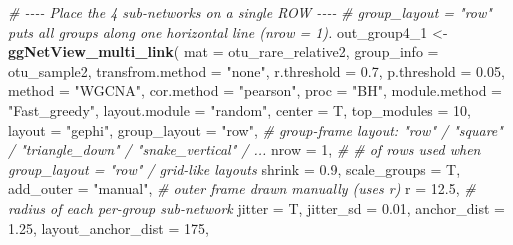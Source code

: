 \documentclass[
]{book}
\newenvironment{Shaded}{\begin{snugshade}}{\end{snugshade}}
\newcommand{\AttributeTok}[1]{\textcolor[rgb]{0.13,0.29,0.53}{#1}}
\newcommand{\CommentTok}[1]{\textcolor[rgb]{0.56,0.35,0.01}{\textit{#1}}}
\newcommand{\DecValTok}[1]{\textcolor[rgb]{0.00,0.00,0.81}{#1}}
\newcommand{\FloatTok}[1]{\textcolor[rgb]{0.00,0.00,0.81}{#1}}
\newcommand{\FunctionTok}[1]{\textcolor[rgb]{0.13,0.29,0.53}{\textbf{#1}}}
\newcommand{\NormalTok}[1]{#1}
\newcommand{\OtherTok}[1]{\textcolor[rgb]{0.56,0.35,0.01}{#1}}
\newcommand{\StringTok}[1]{\textcolor[rgb]{0.31,0.60,0.02}{#1}}
\begin{document}
\begin{Shaded}
\begin{Highlighting}[]
\CommentTok{\# {-}{-}{-}{-} Place the 4 sub{-}networks on a single ROW {-}{-}{-}{-}}
\CommentTok{\# \textasciigrave{}group\_layout = "row"\textasciigrave{} puts all groups along one horizontal line (nrow = 1).}
\NormalTok{out\_group4\_1 }\OtherTok{\textless{}{-}} \FunctionTok{ggNetView\_multi\_link}\NormalTok{(}
  \AttributeTok{mat                          =}\NormalTok{ otu\_rare\_relative2,}
  \AttributeTok{group\_info                   =}\NormalTok{ otu\_sample2,}
  \AttributeTok{transfrom.method             =} \StringTok{"none"}\NormalTok{,}
  \AttributeTok{r.threshold                  =} \FloatTok{0.7}\NormalTok{,}
  \AttributeTok{p.threshold                  =} \FloatTok{0.05}\NormalTok{,}
  \AttributeTok{method                       =} \StringTok{"WGCNA"}\NormalTok{,}
  \AttributeTok{cor.method                   =} \StringTok{"pearson"}\NormalTok{,}
  \AttributeTok{proc                         =} \StringTok{"BH"}\NormalTok{,}
  \AttributeTok{module.method                =} \StringTok{"Fast\_greedy"}\NormalTok{,}
  \AttributeTok{layout.module                =} \StringTok{"random"}\NormalTok{,}
  \AttributeTok{center                       =}\NormalTok{ T,}
  \AttributeTok{top\_modules                  =} \DecValTok{10}\NormalTok{,}
  \AttributeTok{layout                       =} \StringTok{"gephi"}\NormalTok{,}
  \AttributeTok{group\_layout                 =} \StringTok{"row"}\NormalTok{,         }\CommentTok{\# group{-}frame layout: "row" / "square" / "triangle\_down" / "snake\_vertical" / ...}
  \AttributeTok{nrow                         =} \DecValTok{1}\NormalTok{,             }\CommentTok{\# \# of rows used when \textasciigrave{}group\_layout = "row"\textasciigrave{} / grid{-}like layouts}
  \AttributeTok{shrink                       =} \FloatTok{0.9}\NormalTok{,}
  \AttributeTok{scale\_groups                 =}\NormalTok{ T,}
  \AttributeTok{add\_outer                    =} \StringTok{"manual"}\NormalTok{,      }\CommentTok{\# outer frame drawn manually (uses \textasciigrave{}r\textasciigrave{})}
  \AttributeTok{r                            =} \FloatTok{12.5}\NormalTok{,          }\CommentTok{\# radius of each per{-}group sub{-}network}
  \AttributeTok{jitter                       =}\NormalTok{ T,}
  \AttributeTok{jitter\_sd                    =} \FloatTok{0.01}\NormalTok{,}
  \AttributeTok{anchor\_dist                  =} \FloatTok{1.25}\NormalTok{,}
  \AttributeTok{layout\_anchor\_dist           =} \DecValTok{175}\NormalTok{,}

\end{Highlighting}
\end{Shaded}
\end{document}
